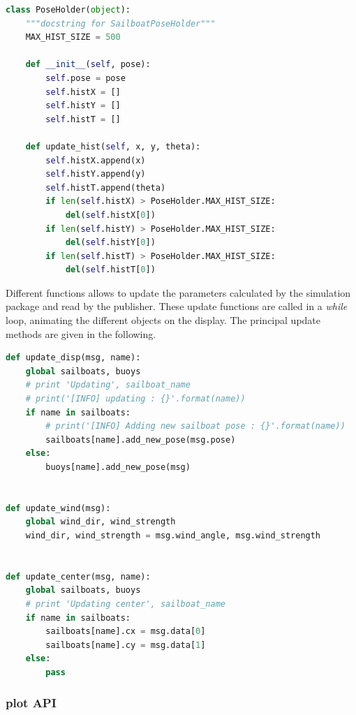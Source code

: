 \documentclass[a4paper]{report}
\begin{document}
\renewcommand{\lstlistingname}{Code}
\begin{lstlisting}[caption=PoseHolder Class, frame=single,language=Python]
class PoseHolder(object):
    """docstring for SailboatPoseHolder"""
    MAX_HIST_SIZE = 500

    def __init__(self, pose):
        self.pose = pose
        self.histX = []
        self.histY = []
        self.histT = []

    def update_hist(self, x, y, theta):
        self.histX.append(x)
        self.histY.append(y)
        self.histT.append(theta)
        if len(self.histX) > PoseHolder.MAX_HIST_SIZE:
            del(self.histX[0])
        if len(self.histY) > PoseHolder.MAX_HIST_SIZE:
            del(self.histY[0])
        if len(self.histT) > PoseHolder.MAX_HIST_SIZE:
            del(self.histT[0])
\end{lstlisting}

Different functions allows to update the  parameters calculated by the simulation package and read by the publisher. These update functions are called in a \textit{while} loop, animating the different objects on the display. The principal update methods are given in the following.  

\renewcommand{\lstlistingname}{Code}
\begin{lstlisting}[caption=Update Functions, frame=single,language=Python]
def update_disp(msg, name):
    global sailboats, buoys
    # print 'Updating', sailboat_name
    # print('[INFO] updating : {}'.format(name))
    if name in sailboats:
        # print('[INFO] Adding new sailboat pose : {}'.format(name))
        sailboats[name].add_new_pose(msg.pose)
    else:
        buoys[name].add_new_pose(msg)


def update_wind(msg):
    global wind_dir, wind_strength
    wind_dir, wind_strength = msg.wind_angle, msg.wind_strength


def update_center(msg, name):
    global sailboats, buoys
    # print 'Updating center', sailboat_name
    if name in sailboats:
        sailboats[name].cx = msg.data[0]
        sailboats[name].cy = msg.data[1]
    else:
        pass


\end{lstlisting}

\subsubsection{plot API}
\end{document}
